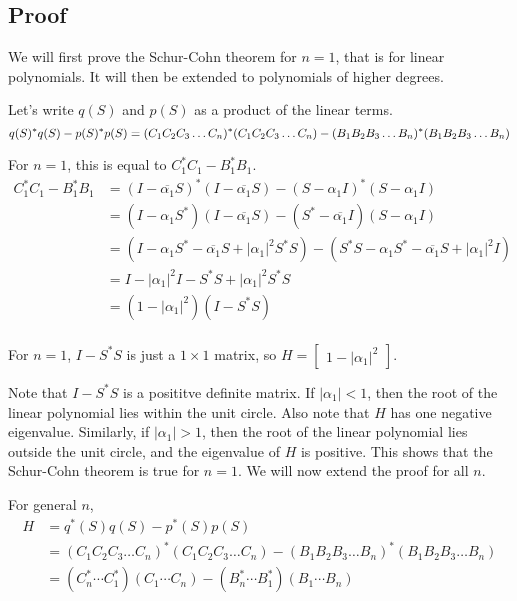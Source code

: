 \documentclass[twofold]{article}
\newcommand*\conj[1]{\overline{#1}}
\newcommand*\adj[1]{#1^*}
\newcommand*\abs[1]{\left \vert #1 \right\vert}
\theoremstyle{plain}
\theoremstyle{definition}
\theoremstyle{remark}
\begin{document}
\subsection{Proof}

We will first prove the Schur-Cohn theorem for \(n =1\), that is for linear polynomials. It will then be extended to polynomials of higher degrees.


Let's write \(q(S)\) and \(p(S)\) as a product of the linear terms. 
\[\adj{q(S)} q(S) - \adj{p(S)} p(S) \\= \adj{(C_1C_2C_3 \ldots C_n)}(C_1C_2C_3\ldots C_n) - \adj{(B_1B_2B_3\ldots B_n)} (B_1B_2B_3\ldots B_n)\]

For \(n =1\), this is equal to \(\adj{C_1} C_1 - \adj{B_1} B_1\). 
\begin{equation*}
\begin{split}
  \adj{C_1}C_1 - \adj{B_1} B_1  & = \adj{(I - \conj{\alpha_1}S)} (I - \conj{\alpha_1}S) - \adj{(S - \alpha_1 I)} (S - \alpha_1 I) \\
& = (I - \alpha_1\adj{S}) (I - \conj{\alpha_1}S) - (\adj{S} - \conj{\alpha_1} I) (S - \alpha_1 I) \\
 & = (I - \alpha_1\adj{S} - \conj{\alpha_1}S + \abs{\alpha_1}^2 \adj{S} S) - (\adj{S} S - \alpha_1 \adj{S} - \conj{\alpha_1} S + \abs{\alpha_1}^2I)\\
& = I - \abs{\alpha_1}^2 I - \adj{S} S + \abs{\alpha_1}^2 \adj{S} S \\
& = (1 - \abs{\alpha_1}^2) (I - \adj{S} S) \\
\end{split}
\end{equation*}

For \(n = 1\), \(I - \adj{S}S\) is just a \(1 \times 1\) matrix, so \(H = \begin{bmatrix} 1 - \abs{\alpha_1}^2 \end{bmatrix}\). 



Note that \(I - \adj{S} S\) is a posititve definite matrix. If \(\abs{\alpha_1} < 1\), then the root of the linear polynomial lies within the unit circle. Also note that \(H\) has one negative eigenvalue. Similarly, if \(\abs{\alpha_1} > 1\), then the root of the linear polynomial lies outside the unit circle, and the eigenvalue of \(H\) is positive. This shows that the Schur-Cohn theorem is true for \(n = 1\). We will now extend the proof for all \(n\). 


For general \(n\),  
\begin{equation*} \begin{split}
H & =  \adj{q}(S) q(S) - \adj{p}(S) p(S) \\
&= \adj{(C_1C_2C_3 \ldots C_n)}(C_1C_2C_3\ldots C_n) - \adj{(B_1B_2B_3\ldots B_n)} (B_1B_2B_3\ldots B_n) \\
& = (\adj{C_n} \cdots \adj{C_1})( C_1 \cdots C_n) - (\adj{B_n} \cdots \adj{B_1}) (B_1 \cdots B_n) 
\end{split} \end{equation*}
\end{document}
